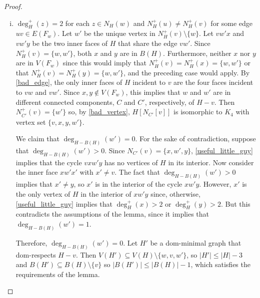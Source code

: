 \documentclass[11pt]{article}
\newcommand{\pat}[1]{\textcolor{red}{PM: #1}}
\theoremstyle{definition}
\begin{document}
\begin{proof}
\begin{enumerate}[(i)]
    \item $\deg^+_H(z)=2$ for each $z\in N_H(w)$ and $N^+_H(u)\neq N^+_H(v)$ for some edge $uv\in E(F_w)$.  Let $w'$ be the unique vertex in $N^+_H(v)\setminus\{w\}$.  Let $vw'x$ and $vw'y$ be the two inner faces of $H$ that share the edge $vw'$.  Since $N^+_H(v)=\{w,w'\}$, both $x$ and $y$ are in $B(H)$. Furthermore, neither $x$ nor $y$ are in $V(F_w)$ since this would imply that $N^+_H(v)= N^+_H(x)=\{w,w'\}$ or that $N^+_H(v)= N^+_H(y)=\{w,w'\}$, and the preceding case would apply.
    By \cref{bad_edge}, the only inner faces of $H$ incident to $v$ are the four faces incident to $vw$ and $vw'$.  Since $x,y\not\in V(F_w)$, this implies that $w$ and $w'$ are in different connected components, $C$ and $C'$, respectively, of $H-v$.  Then $N^+_{C'}(v)=\{w'\}$ so, by \cref{bad_vertex}, $H[N_{C'}[v]]$ is isomorphic to $K_4$ with vertex set $\{v,x,y,w'\}$.

    We claim that $\deg_{H-B(H)}(w')=0$. For the sake of contradiction, suppose that $\deg_{H-B(H)}(w')>0$.  Since $N_{C'}(v)=\{x,w',y\}$, \cref{useful_little_guy} implies that the cycle $vxw'y$ has no vertices of $H$ in its interior.  Now consider the inner face $xw'x'$ with $x'\neq v$. The fact that $\deg_{H-B(H)}(w')>0$ implies that $x'\neq y$, so $x'$ is in the interior of the cycle $xw'y$. However, $x'$ is the only vertex of $H$ in the interior of $xw'y$ since, otherwise, \cref{useful_little_guy} implies that $\deg^+_H(x)>2$ or $\deg^+_H(y)>2$.  But this contradicts the assumptions of the lemma, since it implies that $\deg_{H-B(H)}(w')=1$.

    Therefore, $\deg_{H-B(H)}(w')=0$. Let $H'$ be a dom-minimal graph that dom-respects $H-v$.  Then $V(H')\subseteq V(H)\setminus\{w,v,w'\}$, so $|H'|\le |H|-3$ and $B(H')\subseteq B(H)\setminus\{v\}$ so $|B(H')|\le |B(H)|-1$, which satisfies the requirements of the lemma. \qedhere



\end{enumerate}
\end{proof}
\end{document}
